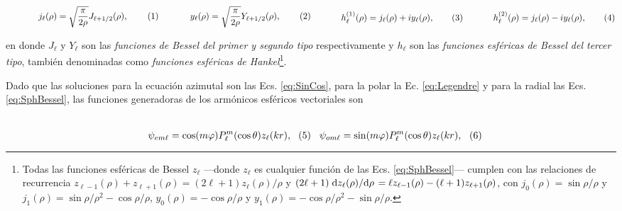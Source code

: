 	\begin{subequations}
	\eqhalf{j_\ell (\rho) = \sqrt{\frac{\pi}{2\rho}} J_{\ell+1/2}(\rho), \label{eqs:jn}}
	\eqhalf{y_\ell (\rho) = \sqrt{\frac{\pi}{2\rho}} Y_{\ell+1/2}(\rho), \label{eqs:yn}}
	\eqhalf{h_\ell^{(1)} (\rho) = j_\ell(\rho) + i y_\ell(\rho), \label{eqs:h1}}
	\eqhalf{h_\ell^{(2)} (\rho) =  j_\ell(\rho) - i y_\ell(\rho), \label{eqs:h2}}
	\label{eq:SphBessel}
	\end{subequations}

\noindent	
en donde $J_\ell$ y $Y_\ell$ son las \emph{funciones de Bessel del primer y segundo tipo} respectivamente y $h_\ell$ son las \emph{funciones esféricas de Bessel del tercer tipo}, también denominadas como \emph{funciones esféricas de Hankel}\footnote{Todas las funciones esféricas de Bessel $z_\ell$ ---donde $z_\ell$ es cualquier función de las Ecs. \eqref{eq:SphBessel}--- cumplen con las  relaciones de recurrencia $	z_{\ell-1}(\rho) + z_{\ell+1}(\rho) =(2\ell+1)z_\ell(\rho)/\rho$ y $(2\ell + 1) \dv*{z_\ell(\rho)}{\rho} = \ell z_{\ell-1}(\rho) - (\ell+1)z_{\ell+1}(\rho)$, con  $j_0(\rho) = \sin\rho / \rho$ y $j_1(\rho) = \sin\rho / \rho^2- \cos\rho/\rho$, $y_0(\rho) = -\cos\rho/\rho$ y $y_1(\rho) = -\cos\rho/\rho^2-\sin\rho/\rho$.}.

Dado que las soluciones para la ecuación azimutal son las Ecs. \eqref{eq:SinCos}, para la polar la Ec. \eqref{eq:Legendre} y para la radial las Ecs. \eqref{eq:SphBessel}, las funciones generadoras de los armónicos esféricos vectoriales son\vspace*{-1em}

 	\begin{subequations}	\eqhalf{\psi_{em\ell} = \cos(m\varphi) P_\ell^m( \cos \theta) z_\ell(k r),}
	\eqhalf{\psi_{om\ell} = \sin(m\varphi) P_\ell^m( \cos \theta) z_\ell(k r),}
	\label{eq:psieo}	\end{subequations}


